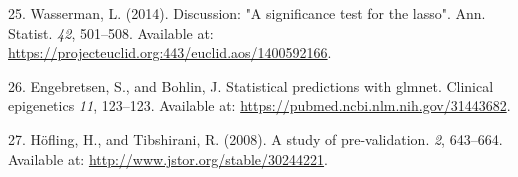 \documentclass[
]{book}
\newenvironment{cslreferences}%
  {}%
  {\par}
\begin{document}
\begin{cslreferences}
\leavevmode\hypertarget{ref-Wasserman:2014aa}{}%
25. Wasserman, L. (2014). Discussion: "A significance test for the lasso". Ann. Statist. \emph{42}, 501--508. Available at: \url{https://projecteuclid.org:443/euclid.aos/1400592166}.

\leavevmode\hypertarget{ref-Engebretsen:2019aa}{}%
26. Engebretsen, S., and Bohlin, J. Statistical predictions with glmnet. Clinical epigenetics \emph{11}, 123--123. Available at: \url{https://pubmed.ncbi.nlm.nih.gov/31443682}.

\leavevmode\hypertarget{ref-Hofling:2008aa}{}%
27. Höfling, H., and Tibshirani, R. (2008). A study of pre-validation. \emph{2}, 643--664. Available at: \url{http://www.jstor.org/stable/30244221}.
\end{cslreferences}
\end{document}
